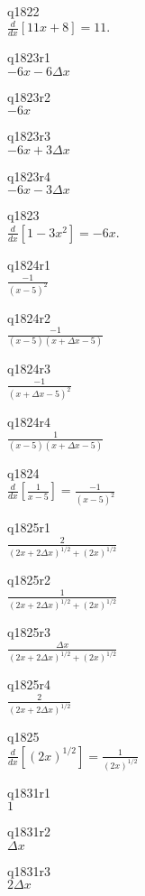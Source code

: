 q1822\\
\(\displaystyle \frac{d}{dx}[11x + 8] = 11. \)

q1823r1\\
\(\displaystyle -6x - 6\Delta x \)

q1823r2\\
\(\displaystyle -6x \)

q1823r3\\
\(\displaystyle -6x + 3\Delta x \)

q1823r4\\
\(\displaystyle -6x - 3\Delta x \)

q1823\\
\(\displaystyle \frac{d}{dx} [1 - 3x^2] = -6x. \)

q1824r1\\
\(\displaystyle \frac{-1}{(x-5)^2} \)

q1824r2\\
\(\displaystyle \frac{-1}{(x-5)(x + \Delta x - 5)} \)

q1824r3\\
\(\displaystyle \frac{-1}{(x+\Delta x - 5)^2} \)

q1824r4\\
\(\displaystyle \frac{1}{(x-5)(x + \Delta x - 5)} \)

q1824\\
\(\displaystyle \frac{d}{dx} \left [ \frac{1}{x-5} \right ] = \frac{-1}{(x-5)^2} \)

q1825r1\\
\(\displaystyle \frac{2}{(2x+2\Delta x)^{1/2} + (2x)^{1/2}} \)

q1825r2\\
\(\displaystyle \frac{1}{(2x+2\Delta x)^{1/2} + (2x)^{1/2}} \)

q1825r3\\
\(\displaystyle \frac{\Delta x}{(2x+2\Delta x)^{1/2} + (2x)^{1/2}} \)

q1825r4\\
\(\displaystyle \frac{2}{(2x+2\Delta x)^{1/2}} \)

q1825\\
\(\displaystyle \frac{d}{dx} [ (2x)^{1/2} ] = \frac{1}{(2x)^{1/2}} \)

q1831r1\\
\(\displaystyle 1 \)

q1831r2\\
\(\displaystyle \Delta x \)

q1831r3\\
\(\displaystyle 2\Delta x \)

